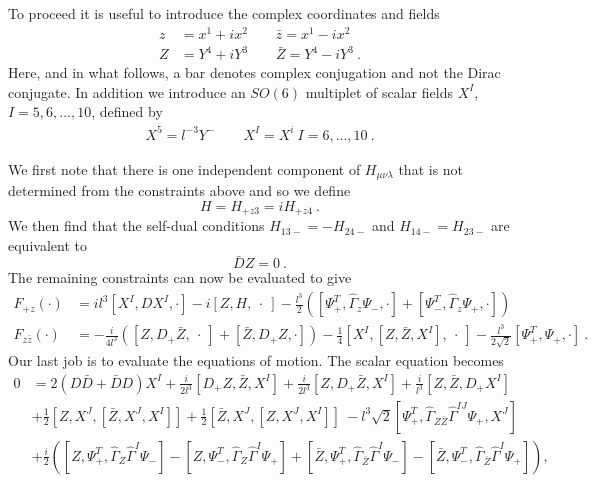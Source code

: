 \documentclass[12pt]{article}
\newcommand{\nn}{\nonumber}
\numberwithin{equation}{section}
\begin{document}
To proceed it is useful to introduce the complex coordinates and fields
\begin{align}
z & =x^{1}+ix^{2}\qquad \bar z =x^{1}-ix^{2}\nn\\
Z &=Y^{4}+iY^{3}\qquad \bar Z =Y^{4}-iY^{3} \ .
\end{align}
Here, and in what follows,  a bar denotes complex conjugation and not the Dirac conjugate. 
In addition we introduce an $SO(6)$ multiplet of scalar fields $X^I$, $I=5,6,...,10$, defined by
\begin{align}
X^5 = l^{-3}Y^- \qquad X^I = X^i\ I=6,...,10\ .
\end{align}

We first note that there is one independent  component of $H_{\mu\nu\lambda}$ that is  not determined from the constraints above and so we define
\begin{equation}
H = H_{+z3}=iH_{+z4}\ .
\end{equation}
We then find that the self-dual conditions $H_{13-}=-H_{24-}$ and $H_{14-}=H_{23-}$ are equivalent to 
\begin{equation}
\bar DZ=0\ .
\end{equation}
The remaining constraints can now be evaluated to give 
\begin{align}
 F_{+z} (\cdot) &= il^3  \left[ X^I, D X^I, \cdot \right] - i \left[ Z, H,\ \cdot \ \right] - \frac{l^3}{2} \left( \left[\Psi^T_+, \hat{\Gamma}_z \Psi_-, \cdot  \right] + \left[\Psi^T_-, \hat{\Gamma}_z \Psi_+, \cdot  \right]  \right) \nn\\
F_{z \bar{z}} (\cdot) &= -\frac{i}{4l^3} \left( \left[Z, D_+ \bar{Z},\ \cdot\  \right] + \left[ \bar{Z}, D_+ Z, \cdot \right] \right)   - \frac{1}{4 }   \left[ X^I, \left[Z, \bar{Z}, X^I  \right],  \ \cdot\ \right] - \frac{l^3}{2\sqrt{2}} \left[ \Psi_+^T, \Psi_+, \cdot  \right] \ . \end{align}
Our last job is to evaluate the equations of motion. The scalar  equation becomes
\begin{align}
0&= 2(D\bar D + \bar D D)X^I +  \frac{ i}{2l^3} [D_+Z,\bar Z,X^I] + \frac{ i}{2l^3} [Z,D_+\bar Z,X^I] + \frac{i}{ l^3} [Z,\bar Z,D_+X^I]\nonumber \\
&  +\frac12 \left[ Z, X^J, [ \bar{Z},X^J,X^I ] \right]+  \frac12 \left[ \bar{Z}, X^J, [ Z   ,X^J,X^I ] \right]\ - l^3 \sqrt{2} \left[ \Psi_+^T, \hat{\Gamma}_{Z \bar{Z}} \hat{\Gamma}^{IJ} \Psi_+, X^J \right] \nonumber \\ & +\frac{i}{2} \left( \left[ Z, \Psi^T_+ ,  \hat{\Gamma}_{Z} \hat{\Gamma}^I \Psi_- \right] - \left[ Z, \Psi^T_- ,  \hat{\Gamma}_{Z} \hat{\Gamma}^I \Psi_+ \right] + \left[ \bar{Z}, \Psi^T_+ ,  \hat{\Gamma}_{\bar{Z}} \hat{\Gamma}^I \Psi_- \right] - \left[ \bar{Z}, \Psi^T_- ,  \hat{\Gamma}_{\bar{Z}} \hat{\Gamma}^I \Psi_+ \right]   \right)   ,
\end{align}
\end{document}
